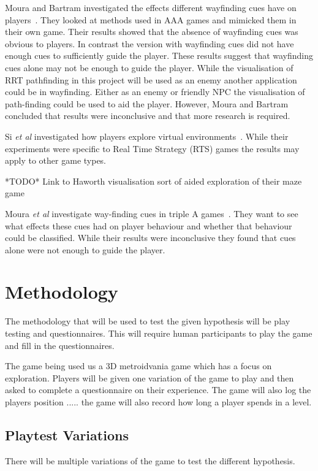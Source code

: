 \documentclass[journal]{IEEEtran}
\begin{document}
Moura and Bartram investigated the effects different wayfinding cues have on players~\cite{moura2014}.  They looked at methods used in AAA games and mimicked them in their own game. Their results showed that the absence of wayfinding cues was obvious to players. In contrast the version with wayfinding cues did not have enough cues to sufficiently guide the player. These results suggest that wayfinding cues alone may not be enough to guide the player. While the visualisation of RRT pathfinding in this project will be used as an enemy another application could be in wayfinding. Either as an enemy or friendly NPC the visualisation of path-finding could be used to aid the player. However, Moura and Bartram concluded that results were inconclusive and that more research is required. 
 
Si \textit{et al} investigated how players explore virtual environments~\cite{si2017}. While their experiments were specific to Real Time Strategy (RTS) games the results may apply to other game types.

*TODO* Link to Haworth visualisation sort of aided exploration of their maze game


Moura \textit{et al} investigate way-finding cues in triple A games~\cite{moura2014}. They want to see what effects these cues had on player behaviour and whether that behaviour could be classified. While their results were inconclusive they found that cues alone were not enough to guide the player.  

\section{Methodology} %
The methodology that will be used to test the given hypothesis will be play testing and questionnaires. This will require human participants to play the game and fill in the questionnaires. 

The game being used us a 3D metroidvania game which has a focus on exploration. Players will be given one variation of the game to play and then asked to complete a questionnaire on their experience. The game will also log the players position .....
the game will also record how long a player spends in a level.  

\subsection{Playtest Variations}
There will be multiple variations of the game to test the different hypothesis. 
\end{document}

